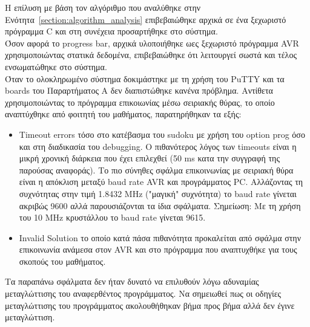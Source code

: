 \documentclass[a4paper,12pt]{article}
\begin{document}
Η επίλυση με βάση τον αλγόριθμο που αναλύθηκε στην Ενότητα~\ref{section:algorithm_analysis} επιβεβαιώθηκε αρχικά σε ένα ξεχωριστό πρόγραμμα C και στη συνέχεια προσαρτήθηκε στο σύστημα.\\

Όσον αφορά το progress bar, αρχικά υλοποιήθηκε ωες ξεχωριστό πρόγραμμα AVR χρησιμοποιώντας στατικά δεδομένα, επιβεβαιώθηκε ότι λειτουργεί σωστά και τέλος ενσωματώθηκε στο σύστημα.\\

Όταν το ολοκληρωμένο σύστημα δοκιμάστηκε με τη χρήση του PuTTY και τα boards του Παραρτήματος Α δεν διαπιστώθηκε κανένα πρόβλημα. Αντίθετα χρησιμοποιώντας το πρόγραμμα επικοιωνίας μέσω σειριακής θύρας, το οποίο αναπτύχθηκε από φοιτητή του μαθήματος, παρατηρήθηκαν τα εξής:\\

\begin{itemize}
	\item Timeout errors τόσο στο κατέβασμα του sudoku με χρήση του option prog όσο και στη διαδικασία του debugging. Ο πιθανότερος λόγος των timeouts είναι η μικρή χρονική διάρκεια που έχει επιλεχθεί (50 ms κατα την συγγραφή της παρούσας αναφοράς). Το πιο σύνηθες σφάλμα επικοινωνίας με σειριακή θύρα είναι η απόκλιση μεταξύ baud rate AVR και προγράμματος PC. Αλλάζοντας τη συχνότητας στην τιμή 1.8432 MHz ("μαγική" συχνότητα) το baud rate γίνεται ακριβώς 9600 αλλά παρουσιάζονται τα ίδια σφάλματα. Σημείωση: Με τη χρήση του 10 MHz κρυστάλλου το baud rate γίνεται 9615.\\

	\item Invalid Solution το οποίο κατά πάσα πιθανότητα προκαλείται από σφάλμα στην επικοινωνία ανάμεσα στον AVR και στο πρόγραμμα που αναπτυχθήκε για τους σκοπούς του μαθήματος.\\
\end{itemize}


Τα παραπάνω σφάλματα δεν ήταν δυνατό να επιλυθούν λόγω αδυναμίας μεταγλώττισης του αναφερθέντος προγράμματος. Να σημειωθεί πως οι οδηγίες μεταγλώττισης του προγράμματος ακολουθήθηκαν βήμα προς βήμα αλλά δεν έγινε μεταγλώττιση.\\
\end{document}
